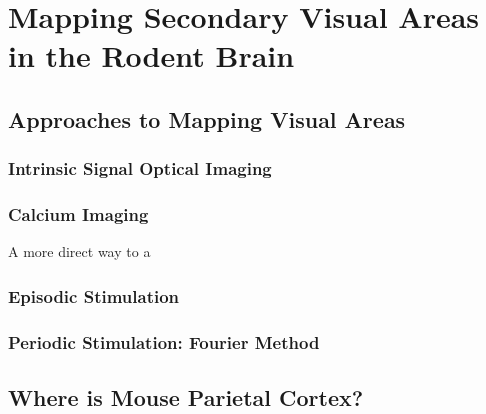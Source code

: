 
\chapter{Mapping Secondary Visual Areas in the Rodent Brain} %

\label{ChapterX} 


\section{Approaches to Mapping Visual Areas}

\subsection{Intrinsic Signal Optical Imaging}

\subsection{Calcium Imaging}
A more direct way to a

\subsection{Episodic Stimulation}

\subsection{Periodic Stimulation: Fourier Method}

\section{Where is Mouse Parietal Cortex?}

